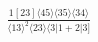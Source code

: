 \documentclass[varwidth, border=5pt]{standalone}
\begin{document}
\begin{my}
$\begin{gathered}
\scriptscriptstyle\frac{1[23]⟨45⟩⟨35⟩⟨34⟩}{⟨13⟩^2⟨23⟩⟨3|1+2|3]}
\end{gathered}$
\end{my}
\end{document}
